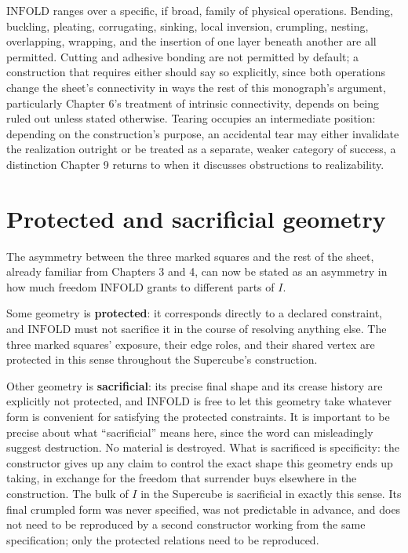 \documentclass[11pt,oneside]{book}
\begin{document}
\(\text{INFOLD}\) ranges over a specific, if broad, family of physical
operations. Bending, buckling, pleating, corrugating, sinking, local
inversion, crumpling, nesting, overlapping, wrapping, and the insertion
of one layer beneath another are all permitted. Cutting and adhesive
bonding are not permitted by default; a construction that requires
either should say so explicitly, since both operations change the
sheet's connectivity in ways the rest of this monograph's argument,
particularly Chapter 6's treatment of intrinsic connectivity, depends on
being ruled out unless stated otherwise. Tearing occupies an
intermediate position: depending on the construction's purpose, an
accidental tear may either invalidate the realization outright or be
treated as a separate, weaker category of success, a distinction Chapter
9 returns to when it discusses obstructions to realizability.

\hypertarget{protected-and-sacrificial-geometry}{%
\section{Protected and sacrificial
geometry}\label{protected-and-sacrificial-geometry}}

The asymmetry between the three marked squares and the rest of the
sheet, already familiar from Chapters 3 and 4, can now be stated as an
asymmetry in how much freedom \(\text{INFOLD}\) grants to different
parts of \(I\).

Some geometry is \textbf{protected}: it corresponds directly to a
declared constraint, and \(\text{INFOLD}\) must not sacrifice it in the
course of resolving anything else. The three marked squares' exposure,
their edge roles, and their shared vertex are protected in this sense
throughout the Supercube's construction.

Other geometry is \textbf{sacrificial}: its precise final shape and its
crease history are explicitly not protected, and \(\text{INFOLD}\) is
free to let this geometry take whatever form is convenient for
satisfying the protected constraints. It is important to be precise
about what ``sacrificial'' means here, since the word can misleadingly
suggest destruction. No material is destroyed. What is sacrificed is
specificity: the constructor gives up any claim to control the exact
shape this geometry ends up taking, in exchange for the freedom that
surrender buys elsewhere in the construction. The bulk of \(I\) in the
Supercube is sacrificial in exactly this sense. Its final crumpled form
was never specified, was not predictable in advance, and does not need
to be reproduced by a second constructor working from the same
specification; only the protected relations need to be reproduced.
\end{document}
